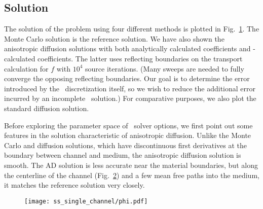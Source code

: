 \subsection{Solution}
The solution of the problem using four different methods is plotted in
Fig.~\ref{fig:ssSingleContour}. The Monte Carlo solution is the reference
solution.  We have also shown the anisotropic diffusion solutions with
both analytically calculated coefficients and \SN-calculated coefficients. The
latter uses reflecting boundaries on the transport calculation for $f$ with
$10^4$ source iterations. (Many sweeps are needed to fully converge the
opposing reflecting boundaries. Our goal is to determine the error introduced by
the \SN\ discretization itself, so we wish to reduce the additional error
incurred by
an incomplete \SN\ solution.) For comparative purposes, we also plot the
standard
diffusion solution.

Before exploring the parameter space of \SN\ solver options, we first point out
some features in the solution characteristic of anisotropic diffusion. Unlike
the Monte Carlo and diffusion solutions, which have discontinuous first
derivatives at the
boundary between channel and medium, the anisotropic diffusion solution is
smooth. The AD solution is less accurate near the material boundaries, but along
the centerline of the channel (Fig.~\ref{fig:ssSingleCenterline}) and a few mean
free paths into the medium, it matches the reference solution very closely.

\begin{figure}[htb]
  \centering
  \texttt{[image: ss\_single\_channel/phi.pdf]}
  \label{fig:ssSingleContour}
\end{figure}

\begin{figure}[htb]
  \centering
  
  \label{fig:ssSingleCenterline}
\end{figure}

